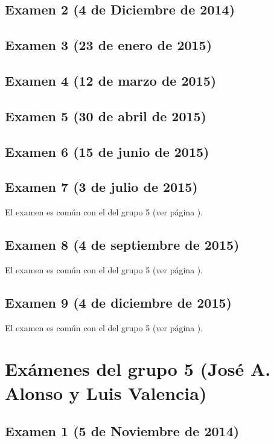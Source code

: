 \documentclass[a4paper,12pt,twoside]{book}
\begin{document}
\subsection{Examen 2 (4 de Diciembre de 2014)}
\subsection{Examen 3 (23 de enero de 2015)}
 \label{examen_14_15_4_3}
\subsection{Examen 4 (12 de marzo de 2015)}
\subsection{Examen 5 (30 de abril de 2015)}
\subsection{Examen 6 (15 de junio de 2015)}
 \label{examen_14_15_4_6}
\subsection{Examen 7 (3 de julio de 2015)}
El examen es común con el del grupo 5 (ver página \pageref{examen_14_15_5_7}).
\subsection{Examen 8 (4 de septiembre de 2015)}
El examen es común con el del grupo 5 (ver página \pageref{examen_14_15_5_7}).
\subsection{Examen 9 (4 de diciembre de 2015)}
El examen es común con el del grupo 5 (ver página \pageref{examen_14_15_5_9}).

\section{Exámenes del grupo 5 (José A. Alonso y Luis Valencia)}
\subsection{Examen 1 (5 de Noviembre de 2014)}
\end{document}
